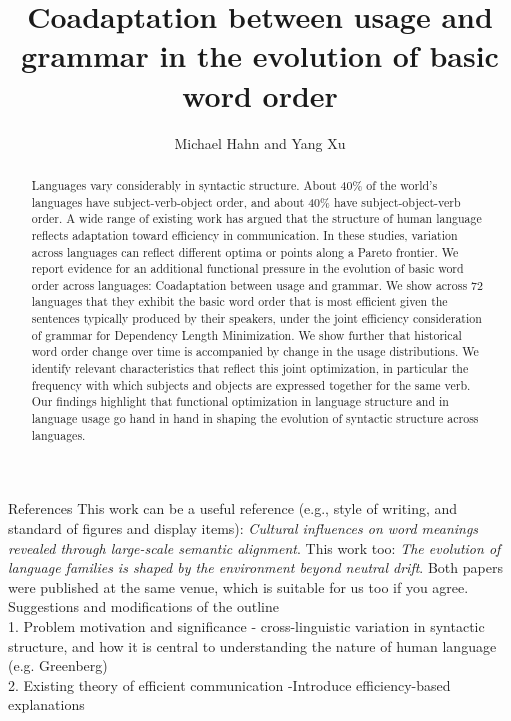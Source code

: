 \documentclass[11pt,a4paper]{article}
\title{Coadaptation between usage and grammar in the evolution of basic word order}
\author{Michael Hahn and Yang Xu}
\begin{document}
\maketitle


\begin{abstract}
Languages vary considerably in syntactic structure.
About 40\% of the world's languages have subject-verb-object order, and about 40\% have subject-object-verb order.
A wide range of existing work has argued that the structure of human language reflects adaptation toward efficiency in communication.
In these studies, variation across languages can reflect different optima or points along a Pareto frontier.
We report evidence for an additional functional pressure in the evolution of basic word order across languages:
Coadaptation between usage and grammar. We show across 72 languages that they exhibit the basic word order that is most efficient given the sentences typically produced by their speakers, under the joint efficiency consideration of grammar for Dependency Length Minimization.
We show further that historical word order change over time is accompanied by change in the usage distributions.
We identify relevant characteristics that reflect this joint optimization, in particular the frequency with which subjects and objects are expressed together for the same verb.
Our findings highlight that functional optimization in language structure and in language usage go hand in hand in shaping the evolution of syntactic structure across languages.
\end{abstract}

{\color{blue}References}
This work can be a useful reference (e.g., style of writing, and standard of figures and display items): {\it Cultural influences on word meanings revealed through large-scale semantic alignment}. This work too: {\it The evolution of language families is shaped by the environment beyond neutral drift}. Both papers were published at the same venue, which is suitable for us too if you agree.\\

{\color{blue}Suggestions and modifications of the outline}\\

{\color{blue}1. Problem motivation and significance - cross-linguistic variation in syntactic structure, and how it is central to understanding the nature of human language (e.g. Greenberg)}\\

{\color{blue}2. Existing theory of efficient communication}
-Introduce efficiency-based explanations
\end{document}
